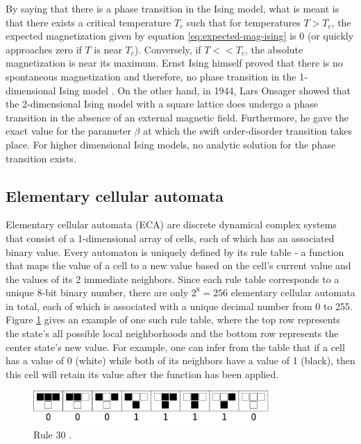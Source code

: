 \documentclass[12pt]{article}
\begin{document}
By saying that there is a phase transition in the Ising model, what is meant is that there exists a critical temperature $T_c$ such that for temperatures $T > T_c$, the expected magnetization given by equation \ref{eq:expected-mag-ising} is 0 (or quickly approaches zero if $T$ is near $T_c$). Conversely, if $T << T_c$, the absolute magnetization is near its maximum. Ernst Ising himself proved that there is no spontaneous magnetization and therefore, no phase transition in the 1-dimensional Ising model \cite{Ising1925}. On the other hand, in 1944, Lars Onsager showed \cite{lars-onsanger} that the 2-dimensional Ising model with a square lattice does undergo a phase transition in the absence of an external magnetic field. Furthermore, he gave the exact value for the parameter $\beta$ at which the swift order-disorder transition takes place. For higher dimensional Ising models, no analytic solution for the phase transition exists. 

\subsection{Elementary cellular automata}

Elementary cellular automata (ECA) are discrete dynamical complex systems that consist of a 1-dimensional array of cells, each of which has an associated binary value. Every automaton is uniquely defined by its rule table - a function that maps the value of a cell to a new value based on the cell's current value and the values of its 2 immediate neighbors. Since each rule table corresponds to a unique 8-bit binary number, there are only $2^8 = 256$ elementary cellular automata in total, each of which is associated with a unique decimal number from 0 to 255. Figure \ref{fig:eca-rule-table} gives an example of one such rule table, where the top row represents the state's all possible local neighborhoods and the bottom row represents the center state's new value. For example, one can infer from the table that if a cell has a value of 0 (white) while both of its neighbors have a value of 1 (black), then this cell will retain its value after the function has been applied. 

\begin{figure} [!h]
\begin{center}
\includegraphics[width=0.8\textwidth]{eca-rule-example}
\caption{Rule 30 \cite{weisstein-eca}.}
\label{fig:eca-rule-table}
\end{center}
\end{figure}
\end{document}
